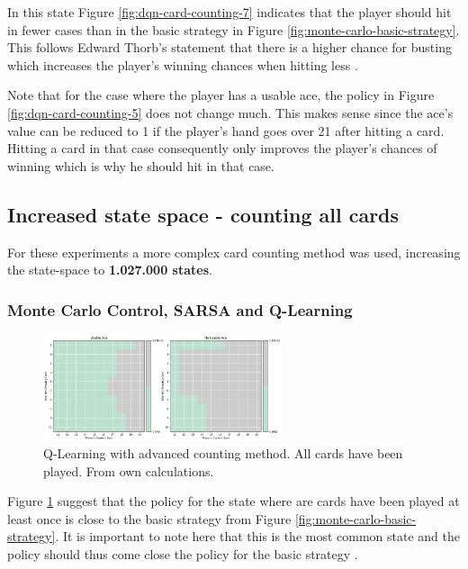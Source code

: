 \documentclass[conference]{IEEEtran}
\begin{document}
In this state Figure \ref{fig:dqn-card-counting-7} indicates that the player should hit in fewer cases than in the basic strategy in Figure \ref{fig:monte-carlo-basic-strategy}.
This follows Edward Thorb's statement that there is a higher chance for busting which increases the player's winning chances when hitting less \cite{b1}.

Note that for the case where the player has a usable ace, the policy in Figure \ref{fig:dqn-card-counting-5} does not change much. 
This makes sense since the ace's value can be reduced to 1 if the player's hand goes over 21 after hitting a card.
Hitting a card in that case consequently only improves the player's chances of winning which is why he should hit in that case. 


\subsection{Increased state space - counting all cards}
For these experiments a more complex card counting method was used, increasing the state-space to \textbf{1.027.000 states}. 

\subsubsection{Monte Carlo Control, SARSA and Q-Learning}

\begin{figure}
	\centering
	\includegraphics[width=70mm]{figures/Q-Learning/advanced-counting-10-million/policy-all-cards-played-1111111111.png}
	\caption{Q-Learning with advanced counting method. All cards have been played. From own calculations.}
	\label{fig:q-learning-advanced-all-cards-played}
\end{figure}

Figure \ref{fig:q-learning-advanced-all-cards-played} suggest that the policy for the state where are cards have been played at least once is close to the basic strategy from Figure \ref{fig:monte-carlo-basic-strategy}.
It is important to note here that this is the most common state and the policy should thus come close the policy for the basic strategy \cite{b1}.
\end{document}
